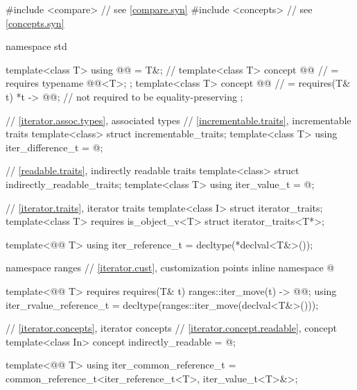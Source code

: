 %
\begin{codeblock}
#include <compare>              // see \ref{compare.syn}
#include <concepts>             // see \ref{concepts.syn}

namespace std {
  template<class T> using @@ = T&;  // \expos
  template<class T> concept @@       // \expos
    = requires { typename @@<T>; };
  template<class T> concept @@     // \expos
    = requires(T& t) {
      { *t } -> @@;  // not required to be equality-preserving
    };

  // \ref{iterator.assoc.types}, associated types
  // \ref{incrementable.traits}, incrementable traits
  template<class> struct incrementable_traits;
  template<class T>
    using iter_difference_t = @\seebelow@;

  // \ref{readable.traits}, indirectly readable traits
  template<class> struct indirectly_readable_traits;
  template<class T>
    using iter_value_t = @\seebelow@;

  // \ref{iterator.traits}, iterator traits
  template<class I> struct iterator_traits;
  template<class T> requires is_object_v<T> struct iterator_traits<T*>;

  template<@@ T>
    using iter_reference_t = decltype(*declval<T&>());

  namespace ranges {
    // \ref{iterator.cust}, customization points
    inline namespace @
  }

  template<@@ T>
    requires requires(T& t) {
      { ranges::iter_move(t) } -> @@;
    }
  using iter_rvalue_reference_t
    = decltype(ranges::iter_move(declval<T&>()));

  // \ref{iterator.concepts}, iterator concepts
  // \ref{iterator.concept.readable}, concept 
  template<class In>
    concept indirectly_readable = @\seebelow@;

  template<@@ T>
    using iter_common_reference_t =
      common_reference_t<iter_reference_t<T>, iter_value_t<T>&>;

}
\end{codeblock}
